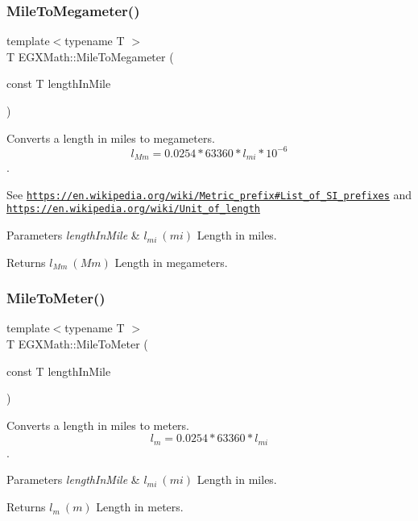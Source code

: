 \subsubsection{\texorpdfstring{Mile\+To\+Megameter()}{MileToMegameter()}}
{\footnotesize\ttfamily template$<$typename T $>$ \\
T E\+G\+X\+Math\+::\+Mile\+To\+Megameter (\begin{DoxyParamCaption}\item[{const T}]{length\+In\+Mile }\end{DoxyParamCaption})}



Converts a length in miles to megameters. \[ l_{Mm}=0.0254 * 63360 * l_{mi} * 10^{-6} \]. 

See \href{https://en.wikipedia.org/wiki/Metric_prefix#List_of_SI_prefixes}{\tt https\+://en.\+wikipedia.\+org/wiki/\+Metric\+\_\+prefix\#\+List\+\_\+of\+\_\+\+S\+I\+\_\+prefixes} and \href{https://en.wikipedia.org/wiki/Unit_of_length}{\tt https\+://en.\+wikipedia.\+org/wiki/\+Unit\+\_\+of\+\_\+length} 
\begin{DoxyParams}{Parameters}
{\em length\+In\+Mile} & $ l_{mi}\ (mi)$ Length in miles. \\
\hline
\end{DoxyParams}
\begin{DoxyReturn}{Returns}
$ l_{Mm}\ (Mm)$ Length in megameters. 
\end{DoxyReturn}
\mbox{\label{group___e_g_x_math-_conversions-_length_conversions-_imperial-_mile-_s_i_ga39ebb5e23ea39eb97487dfcd5454c062}} 
\subsubsection{\texorpdfstring{Mile\+To\+Meter()}{MileToMeter()}}
{\footnotesize\ttfamily template$<$typename T $>$ \\
T E\+G\+X\+Math\+::\+Mile\+To\+Meter (\begin{DoxyParamCaption}\item[{const T}]{length\+In\+Mile }\end{DoxyParamCaption})}



Converts a length in miles to meters. \[ l_{m}=0.0254 * 63360 * l_{mi} \]. 


\begin{DoxyParams}{Parameters}
{\em length\+In\+Mile} & $ l_{mi}\ (mi)$ Length in miles. \\
\hline
\end{DoxyParams}
\begin{DoxyReturn}{Returns}
$ l_{m}\ (m)$ Length in meters. 
\end{DoxyReturn}
\mbox{\label{group___e_g_x_math-_conversions-_length_conversions-_imperial-_mile-_s_i_ga59355064bc6419c5dc24f89bb13ec070}} 

